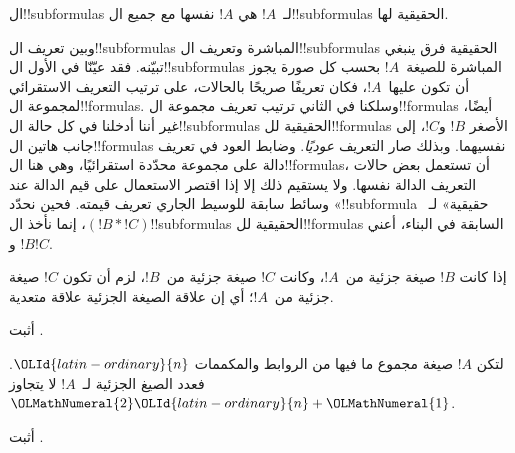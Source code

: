 \documentclass[../../../include/open-logic-section]{subfiles}
\begin{document}
\begin{defn}[!!^{subformula}]
ال!!{subformula}s لـ~$!A$ هي $!A$ نفسها مع جميع ال!!{subformula}s
الحقيقية لها.
\end{defn}

\begin{explain}
وبين تعريف ال!!{subformula}s المباشرة وتعريف ال!!{subformula}s
الحقيقية فرق ينبغي تبيّنه. فقد عيّنّا في الأول ال!!{subformula}s
المباشرة للصيغة~$!A$ بحسب كل صورة يجوز أن تكون عليها~$!A$، فكان
تعريفًا صريحًا بالحالات، على ترتيب التعريف الاستقرائي لمجموعة
ال!!{formula}s. وسلكنا في الثاني ترتيب تعريف مجموعة
ال!!{formula}s أيضًا، غير أننا أدخلنا في كل حالة ال!!{subformula}s
الحقيقية لل!!{formula}s الأصغر $!B$ و$!C$، إلى جانب هاتين
ال!!{formula}s نفسيهما. وبذلك صار التعريف \emph{عوديًا}.
وضابط العود في تعريف دالة على مجموعة محدّدة استقرائيًا، وهي هنا
ال!!{formula}s، أن تستعمل بعض حالات التعريف الدالة نفسها.
ولا يستقيم ذلك إلا إذا اقتصر الاستعمال على قيم الدالة عند وسائط
سابقة للوسيط الجاري تعريف قيمته. فحين نحدّد «!!{subformula} حقيقية»
لـ~$(!B \ast !C)$، إنما نأخذ ال!!{subformula}s الحقيقية
لل!!{formula}s السابقة في البناء، أعني $!B$ و$!C$.
\end{explain}

\begin{prop}
إذا كانت $!B$ صيغة جزئية من~$!A$، وكانت $!C$ صيغة جزئية من~$!B$،
لزم أن تكون $!C$ صيغة جزئية من~$!A$؛ أي إن علاقة الصيغة
الجزئية علاقة متعدية.
\end{prop}

\begin{prob}
أثبت .
\end{prob}

\begin{prop}
لتكن $!A$ صيغة مجموع ما فيها من الروابط والمكممات $\OLId{latin-ordinary}{n}$.
فعدد الصيغ الجزئية لـ~$!A$ لا يتجاوز $\OLMathNumeral{2}\OLId{latin-ordinary}{n}+\OLMathNumeral{1}$.
\end{prop}

\begin{prob}
أثبت .
\end{prob}
\end{document}
